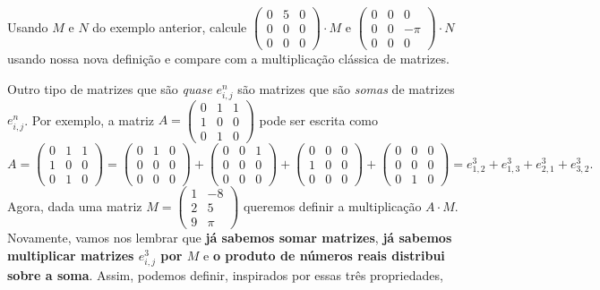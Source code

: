 \begin{exerc}
	Usando $M$ e $N$ do exemplo anterior, calcule $\begin{pmatrix}
	0 & 5 & 0\\
	0&0&0\\
	0&0&0
	\end{pmatrix}\cdot M$ e $\begin{pmatrix}
	0 & 0 & 0\\
	0&0&-\pi\\
	0&0&0
	\end{pmatrix}\cdot N$ usando nossa nova definição e compare com a multiplicação clássica de matrizes.
\end{exerc}

\bigskip
Outro tipo de matrizes que são \textit{quase} $e^n_{i,j}$ são matrizes que são \textit{somas} de matrizes $e^n_{i,j}$. Por exemplo, a matriz $A=\begin{pmatrix}
0 & 1 & 1\\
1 & 0 & 0\\
0 & 1 & 0
\end{pmatrix}$ pode ser escrita como
\[A=\begin{pmatrix}
0 & 1 & 1\\
1 & 0 & 0\\
0 & 1 & 0
\end{pmatrix}=\begin{pmatrix}
0 & 1 & 0\\
0&0&0\\
0&0&0
\end{pmatrix}+ \begin{pmatrix}
0 & 0 & 1 \\
0 & 0 & 0 \\
0 & 0 & 0 
\end{pmatrix}  + \begin{pmatrix}
0 & 0 & 0 \\
1 & 0 & 0 \\
0 & 0 & 0 
\end{pmatrix}  + \begin{pmatrix}
0 & 0 & 0 \\
0 & 0 & 0 \\
0 & 1 & 0 
\end{pmatrix}  =e^3_{1,2}+e^3_{1,3}+e^3_{2,1}+e^3_{3,2}.\] Agora, dada uma matriz $M=\begin{pmatrix}
1 & -8\\
2 & 5\\
9 & \pi
\end{pmatrix}$ queremos definir a multiplicação $A\cdot M$. Novamente, vamos nos lembrar que \textbf{já sabemos somar matrizes}, \textbf{já sabemos multiplicar matrizes $e^3_{i,j}$ por $M$} e \textbf{o produto de números reais distribui sobre a soma}. Assim, podemos definir, inspirados por essas três propriedades,
